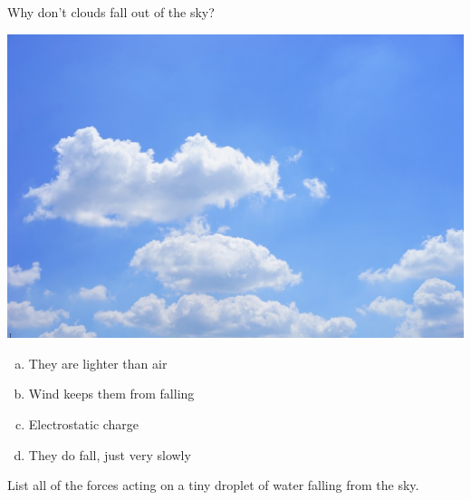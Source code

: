 
\begin{applicationActivities}




\begin{activity}{5}
Why don't clouds fall out of the sky?
\begin{center}
\includegraphics[scale=0.2]{media/cloud.jpg}
\end{center}

\begin{enumerate}[(a)]
\item They are lighter than air
\item Wind keeps them from falling
\item Electrostatic charge
\item They do fall, just very slowly
\end{enumerate}
\end{activity}

\begin{activity}{5}
List all of the forces acting on a tiny droplet of water falling from the sky.
\end{activity}


\end{applicationActivities}
